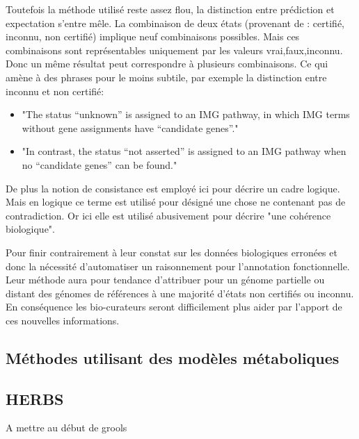 \begin{refsegment}
    Toutefois la méthode utilisé reste assez flou, la distinction entre prédiction et expectation s'entre mêle. La combinaison de deux états (provenant de : certifié, inconnu, non certifié) implique neuf combinaisons possibles. Mais ces combinaisons sont représentables uniquement par les valeurs vrai,faux,inconnu. Donc un même résultat peut correspondre à plusieurs combinaisons. Ce qui amène à des phrases pour le moins subtile, par exemple la distinction entre inconnu et non certifié:
    \begin{itemize}
        \item "The status “unknown” is assigned to an IMG pathway, in which IMG terms without gene assignments have “candidate genes”."
        \item "In contrast, the status “not asserted” is assigned to an IMG pathway when no “candidate genes” can be found."
    \end{itemize}
    
    De plus la notion de consistance est employé ici pour décrire un cadre logique. Mais en logique ce terme est utilisé pour désigné une chose ne contenant pas de contradiction. Or ici elle est utilisé abusivement pour décrire "une cohérence biologique".
    
    Pour finir contrairement à leur constat sur les données biologiques erronées et donc la nécessité d'automatiser un raisonnement pour l'annotation fonctionnelle. Leur méthode aura pour tendance d'attribuer pour un génome partielle ou distant des génomes de références à une majorité d'états non certifiés ou inconnu. En conséquence les bio-curateurs seront difficilement plus aider par l'apport de ces nouvelles informations.
    
    \subsection{Méthodes utilisant des modèles métaboliques}
    
    \subsection{HERBS}
    A mettre au début de grools
    
    \subbibliography
\end{refsegment}